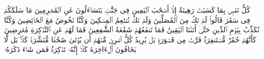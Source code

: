 كُلُّ نَفۡسِۭ بِمَا كَسَبَتۡ رَهِینَةٌ%
\stopbuffer%
\startbuffer[\q:74:39]
إِلَّاۤ أَصۡحَٰبَ ٱلۡیَمِینِ%
\stopbuffer%
\startbuffer[\q:74:40]
فِی جَنَّٰتࣲ یَتَسَاۤءَلُونَ%
\stopbuffer%
\startbuffer[\q:74:41]
عَنِ ٱلۡمُجۡرِمِینَ%
\stopbuffer%
\startbuffer[\q:74:42]
مَا سَلَكَكُمۡ فِی سَقَرَ%
\stopbuffer%
\startbuffer[\q:74:43]
قَالُوا۟ لَمۡ نَكُ مِنَ ٱلۡمُصَلِّینَ%
\stopbuffer%
\startbuffer[\q:74:44]
وَلَمۡ نَكُ نُطۡعِمُ ٱلۡمِسۡكِینَ%
\stopbuffer%
\startbuffer[\q:74:45]
وَكُنَّا نَخُوضُ مَعَ ٱلۡخَاۤئِضِینَ%
\stopbuffer%
\startbuffer[\q:74:46]
وَكُنَّا نُكَذِّبُ بِیَوۡمِ ٱلدِّینِ%
\stopbuffer%
\startbuffer[\q:74:47]
حَتَّىٰۤ أَتَىٰنَا ٱلۡیَقِینُ%
\stopbuffer%
\startbuffer[\q:74:48]
فَمَا تَنفَعُهُمۡ شَفَٰعَةُ ٱلشَّٰفِعِینَ%
\stopbuffer%
\startbuffer[\q:74:49]
فَمَا لَهُمۡ عَنِ ٱلتَّذۡكِرَةِ مُعۡرِضِینَ%
\stopbuffer%
\startbuffer[\q:74:50]
كَأَنَّهُمۡ حُمُرࣱ مُّسۡتَنفِرَةࣱ%
\stopbuffer%
\startbuffer[\q:74:51]
فَرَّتۡ مِن قَسۡوَرَةِۭ%
\stopbuffer%
\startbuffer[\q:74:52]
بَلۡ یُرِیدُ كُلُّ ٱمۡرِئࣲ مِّنۡهُمۡ أَن یُؤۡتَىٰ صُحُفࣰا مُّنَشَّرَةࣰ%
\stopbuffer%
\startbuffer[\q:74:53]
كَلَّاۖ بَل لَّا یَخَافُونَ ٱلۡءَاخِرَةَ%
\stopbuffer%
\startbuffer[\q:74:54]
كَلَّاۤ إِنَّهُۥ تَذۡكِرَةࣱ%
\stopbuffer%
\startbuffer[\q:74:55]
فَمَن شَاۤءَ ذَكَرَهُۥ%
\stopbuffer%
